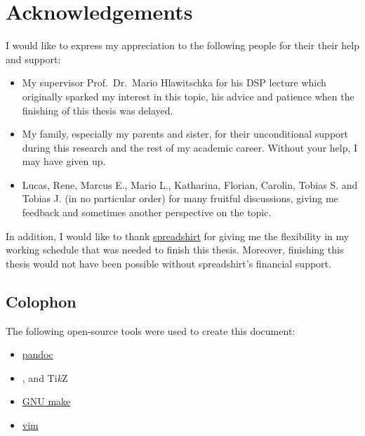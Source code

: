 \chapter*{Acknowledgements}

I would like to express my appreciation to the following people for their their help and support:

\begin{itemize}
\item My supervisor Prof.~Dr.~Mario Hlawitschka for his DSP lecture which originally sparked my interest in this topic, his advice and patience when the finishing of this thesis was delayed.
\item My family, especially my parents and sister, for their unconditional support during this research and the rest of my academic career. Without your help, I may have given up.
\item Lucas, Rene, Marcus E., Mario L., Katharina, Florian, Carolin, Tobias S. and Tobias J. (in no particular order) for many fruitful discussions, giving me feedback and sometimes another perspective on the topic.
\end{itemize}

In addition, I would like to thank \href{https://www.spreadshirt.net/}{spreadshirt} for giving me the flexibility in my working schedule that was needed to finish this thesis.
Moreover, finishing this thesis would not have been possible without spreadshirt's financial support.

\section*{Colophon}

The following open-source tools were used to create this document:

\begin{itemize}
\item \href{https://pandoc.org}{pandoc}
\item \LaTeXe{}, \XeLaTeX{} and Ti\textit{k}Z
\item \href{https://www.gnu.org/software/make}{GNU make}
\item \href{https://www.vim.org}{vim}
\end{itemize}
